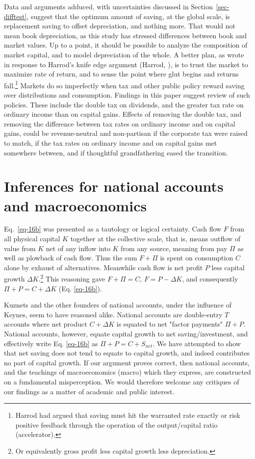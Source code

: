 \documentclass[a4paper,fleqn]{latex_styles/cas-sc}
\begin{document}
Data and arguments adduced, with uncertainties discussed in Section~\ref{sec-difftest}, suggest that the optimum amount of
saving, at the global scale, is replacement saving to offset depreciation, and nothing
more. That would not mean book depreciation, as this study has stressed
differences between book and market values. Up to a point, it should be
possible to analyze the composition of market capital, and to model
depreciation of the whole. A better plan, as
\citet{solowContributionTheoryEconomic1956a} wrote in response to
Harrod's knife edge argument (Harrod, \citeyear{harrodEssayDynamicTheory1939}), is to
trust the market to maximize rate of return, and to sense the point
where glut begins and returns fall.\footnote{Harrod had argued that
saving must hit the warranted rate exactly or risk positive
feedback through the operation of the output/capital ratio
(accelerator).}
%
Markets do so imperfectly when tax and other public policy reward
saving over distributions and consumption. Findings in this paper
suggest review of such policies. These include the double tax on
dividends, and the greater tax rate on ordinary income than on capital
gains. Effects of removing the double tax, and removing the difference
between tax rates on ordinary income and on capital gains, could be
revenue-neutral and non-partisan if the corporate tax were raised to
match, if the tax rates on ordinary income and on capital gains met
somewhere between, and if thoughtful grandfathering eased the
transition.

\section{Inferences for national accounts and macroeconomics}

Eq.~\eqref{eq-16b} was presented as a tautology or logical certainty. Cash flow \(F\) from all physical capital \(K\) together at the collective scale, that is, means outflow of value from \(K\) net of any inflow into \(K\) from any source, meaning from pay \(\Pi\) as well as plowback of cash flow. Thus the sum \(F+\Pi\) is spent on consumption \(C\) alone by exhaust of alternatives. Meanwhile cash flow is net profit \(P\) less capital growth \(\Delta K\).\footnote{Or equivalently gross profit less capital growth less depreciation.} This reasoning gave \(F+\Pi = C\), \(F = P - \Delta K\), and consequently \(\Pi + P = C + \Delta K\) (Eq. \eqref{eq-16b}).

    Kuznets and the other founders of national accounts, under the influence of Keynes, seem to have reasoned alike. National accounts are double-entry \(T\) accounts where net product \(C + \Delta K\) is equated to net "factor payments" \(\Pi + P\). National accounts, however, equate capital growth to net saving/investment, and effectively write Eq. \eqref{eq-16b} as \(\Pi + P = C + S_{net}\). We have attempted to show that net saving does not tend to equate to capital growth, and indeed contributes no part of capital growth. If our argument proves correct, then national accounts, and the teachings of macroeconomics (macro) which they express, are constructed on a fundamental misperception. We would therefore welcome any critiques of our findings as a matter of academic and public interest.
\end{document}
